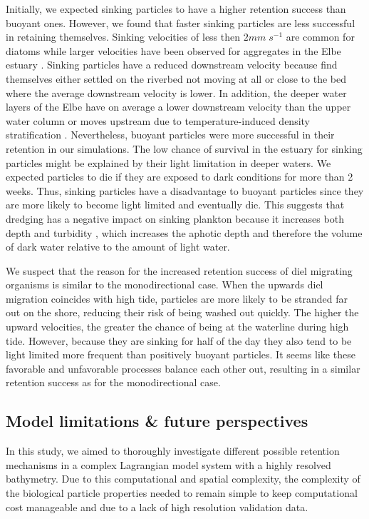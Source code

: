 \documentclass[npg, manuscript]{copernicus}
\begin{document}
Initially, we expected sinking particles to have a higher retention success than buoyant ones. 
However, we found that faster sinking particles are less successful in retaining themselves.
Sinking velocities of less then $2 \unit{mm\;s^{-1}}$ are common for diatoms \citep{Passow1991} while larger velocities have been observed for aggregates in the Elbe estuary \citep{Fennessy1996}.
Sinking particles have a reduced downstream velocity because find themselves either settled on the riverbed not moving at all or close to the bed where the average downstream velocity is lower.
In addition, the deeper water layers of the Elbe have on average a lower downstream velocity than the upper water column or moves upstream  due to temperature-induced density stratification \citep{Pein2021}.
Nevertheless, buoyant particles were more successful in their retention in our simulations.
The low chance of survival in the estuary for sinking particles might be explained by their light limitation in deeper waters.
We expected particles to die if they are exposed to dark conditions for more than 2 weeks.
Thus, sinking particles have a disadvantage to buoyant particles since they are more likely to become light limited and eventually die.
This suggests that dredging has a negative impact on sinking plankton because it increases both depth and turbidity \citep{DeJonge2014}, which increases the aphotic depth and therefore the volume of dark water relative to the amount of light water.

We suspect that the reason for the increased retention success of diel migrating organisms is similar to the monodirectional case.
When the upwards diel migration coincides with high tide, particles are more likely to be stranded far out on the shore, reducing their risk of being washed out quickly.
The higher the upward velocities, the greater the chance of being at the waterline during high tide.
However, because they are sinking for half of the day they also tend to be light limited more frequent than positively buoyant particles.
It seems like these favorable and unfavorable processes balance each other out, resulting in a similar retention success as for the monodirectional case.


\subsection{Model limitations \& future perspectives}

In this study, we aimed to thoroughly investigate different possible retention mechanisms in a complex Lagrangian model system with a highly resolved bathymetry.  
Due to this computational and spatial complexity, the complexity of the biological particle properties needed to remain simple to keep computational cost manageable and due to a lack of high resolution validation data.
\end{document}
